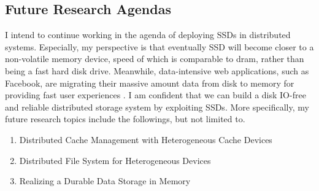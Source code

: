 \documentclass[letterpaper, 10pt]{article}
\begin{document}
\subsection*{Future Research Agendas}

I intend to continue working in the agenda of deploying SSDs in distributed
systems. Especially, my perspective is that eventually SSD will become
closer to
a non-volatile memory device, speed of which is comparable to dram,
rather than being a fast hard disk drive.
Meanwhile, data-intensive web applications, such as Facebook, are migrating
their massive amount data from disk to memory for providing fast user
experiences \cite{fb}.
I am confident that we can build a disk IO-free and reliable
distributed storage
system by exploiting SSDs. More specifically, my future research topics include
the followings, but not limited to.

\begin{enumerate}
\item Distributed Cache Management with Heterogeneous Cache Devices
\item Distributed File System for Heterogeneous Devices
\item Realizing a Durable Data Storage in Memory
\end{enumerate}

\vspace{0.5cm}

\end{document}

